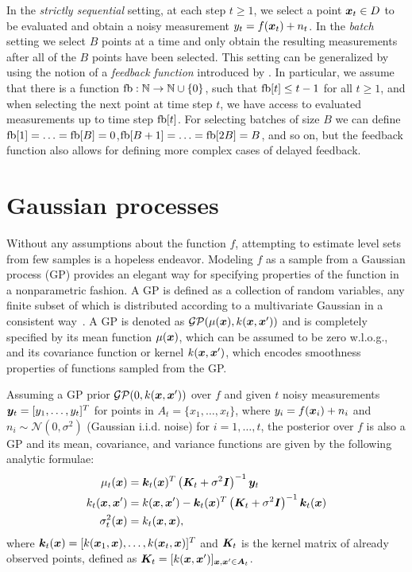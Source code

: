 In the \emph{strictly sequential} setting,
at each step $t \geq 1$, we select a point $\bm{x}_t \in D$ to be evaluated and
obtain a noisy measurement $y_t = f(\bm{x}_t) + n_t$.
In the \emph{batch} setting we select $B$ points at a time and only obtain
the resulting measurements after all of the $B$ points have been selected.
This setting can be generalized by using the notion of a
\emph{feedback function} introduced by \citet{desautels12}.
In particular, we assume that there is a function
${\mathop{\mathrm{fb}} : \mathbb{N} \to \mathbb{N}\cup\{0\}}$, such that
$\mathop{\mathrm{fb}}[t] \leq t-1$ for all $t \geq 1$, and when selecting the next point
at time step $t$, we have access to evaluated measurements up to
time step $\mathop{\mathrm{fb}}[t]$. For selecting batches of size $B$ we can define
$\mathop{\mathrm{fb}}[1] = \ldots = \mathop{\mathrm{fb}}[B] = 0$,\enskip$\mathop{\mathrm{fb}}[B+1] = \ldots = \mathop{\mathrm{fb}}[2B] = B$,
and so on,
but the feedback function also allows for defining more complex cases
of delayed feedback.

\section{Gaussian processes}
 Without any assumptions about the function $f$, attempting to estimate level sets from few samples is a hopeless endeavor.
Modeling $f$ as a sample from a Gaussian process
(GP) provides an elegant way for specifying properties of the function in a
nonparametric fashion. A GP is defined as a collection of random variables,
any finite subset of which is distributed according to a
multivariate Gaussian in a consistent way~\cite{rasmussen06}. A GP is
denoted as $\mathcal{GP}(\mu(\bm{x}), k(\bm{x}, \bm{x}'))$ and is
completely specified by its mean function $\mu(\bm{x})$, which can be
assumed to be zero w.l.o.g., and its covariance function or kernel
$k(\bm{x}, \bm{x}')$, which encodes smoothness properties of functions sampled
from the GP.

Assuming a GP prior $\mathcal{GP}(0, k(\bm{x}, \bm{x}'))$ over $f$ and given
$t$ noisy measurements $\bm{y}_t = [y_1,\ldots,y_t]^T$ for
points in $A_t = \{x_1,\ldots,x_t\}$,
where $y_i = f(\bm{x}_i) + n_i$ and
${n_i \sim \mathcal{N}(0, \sigma^2)}$ (Gaussian i.i.d. noise)
for $i = 1,\ldots,t$, the posterior over $f$ is also a
GP and its mean, covariance, and variance functions are given by the
following analytic formulae:
\begin{align}
\mu_t(\bm{x}) &= \bm{k}_t(\bm{x})^T\left(\bm{K}_t + \sigma^2 \bm{I}\right)^{-1}\bm{y}_t\label{eq:mean}\\
k_t(\bm{x}, \bm{x}') &= k(\bm{x}, \bm{x}') - \bm{k}_t(\bm{x})^T\left(\bm{K}_t + \sigma^2 \bm{I}\right)^{-1}\bm{k}_t(\bm{x})\notag\\
\sigma_t^2(\bm{x}) &= k_t(\bm{x}, \bm{x})\label{eq:var},
\end{align}
where $\bm{k}_t(\bm{x}) = [k(\bm{x}_1, \bm{x}),\ldots,k(\bm{x}_t, \bm{x})]^T$ and $\bm{K}_t$ is
the kernel matrix of already observed points, defined as
${\bm{K}_t = [k(\bm{x}, \bm{x}')]_{\bm{x}, \bm{x}'\in\bm{A}_t}}$.
